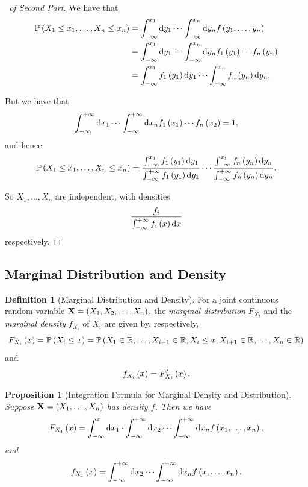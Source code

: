 \documentclass{article}
\newtheorem{proposition}[theorem]{Proposition}
\theoremstyle{definition}
\newtheorem{definition}[theorem]{Definition}
\theoremstyle{remark}
\newcommand{\RR}{\mathbb{R}}
\newcommand{\Prob}{\mathbb{P}}
\newcommand{\plusinfty}{+\infty}
\newcommand{\minusinfty}{-\infty}
\begin{document}
\begin{proof}[\proofname\ of Second Part]
    We have that
    \begin{align*}
        \Prob\pqty{X_1 \leq x_1, \ldots, X_n \leq x_n} &= \int_{\minusinfty}^{x_1} \dd{y_1} \cdots \int_{\minusinfty}^{x_n} \dd{y_n} f\pqty{y_1, \ldots, y_n} \\
        &= \int_{\minusinfty}^{x_1} \dd{y_1} \cdots \int_{\minusinfty}^{x_n} \dd{y_n} f_1\pqty{y_1} \cdots f_n\pqty{y_n} \\
        &= \int_{\minusinfty}^{x_1} f_1\pqty{y_1} \dd{y_1} \cdots \int_{\minusinfty}^{x_n} f_n\pqty{y_n} \dd{y_n}.
    \end{align*}

    But we have that
    \[
        \int_{\minusinfty}^{\plusinfty} \dd{x_1} \cdots \int_{\minusinfty}^{\plusinfty} \dd{x_n} f_1\pqty{x_1} \cdots f_n\pqty{x_2} = 1,
    \]
    and hence
    \[
        \Prob\pqty{X_1 \leq x_1, \ldots, X_n \leq x_n} = \frac{\int_{\minusinfty}^{x_1} f_1\pqty{y_1} \dd{y_1}}{\int_{\minusinfty}^{\plusinfty} f_1\pqty{y_1} \dd{y_1}} \cdots \frac{\int_{\minusinfty}^{x_1} f_n\pqty{y_n} \dd{y_n}}{\int_{\minusinfty}^{\plusinfty} f_n\pqty{y_n} \dd{y_n}}.
    \]

    So \(X_1, \ldots, X_n\) are independent, with densities
    \[
        \frac{f_i}{\int_{\minusinfty}^{\plusinfty} f_i\pqty{x} \dd{x}}
    \]
    respectively.
\end{proof}

\subsection{Marginal Distribution and Density}

\begin{definition}[Marginal Distribution and Density]
    \label{def:marginal-distribution-density}%
    For a joint continuous random variable \(\vb{X} = \pqty{X_1, X_2, \ldots, X_n}\), the \emph{marginal distribution} \(F_{X_i}\) and the \emph{marginal density} \(f_{X_i}\) of \(X_i\) are given by, respectively,
    \[
        F_{X_i} \pqty{x} = \Prob\pqty{X_i \leq x} = \Prob\pqty{X_1 \in \RR, \ldots, X_{i - 1} \in \RR, X_i \leq x, X_{i + 1} \in \RR, \ldots, X_n \in \RR}
    \]
    and
    \[
        f_{X_i} \left(x\right) = F_{X_i}'\left(x\right).
    \]
\end{definition}

\begin{proposition}[Integration Formula for Marginal Density and Distribution]
    \label{prop:marginal-distribution-density-formula}%
    Suppose \(\vb{X} = \pqty{X_1, \ldots, X_n}\) has density \(f\). Then we have
    \[
        F_{X_1} \pqty{x} = \int_{\minusinfty}^{x} \dd{x_1} \cdot \int_{\minusinfty}^{\plusinfty} \dd{x_2} \cdots \int_{\minusinfty}^{\plusinfty} \dd{x_n} f\pqty{x_1, \ldots, x_n},
    \]
    and
    \[
        f_{X_1} \pqty{x} = \int_{\minusinfty}^{\plusinfty} \dd{x_2} \cdots \int_{\minusinfty}^{\plusinfty} \dd{x_n} f\pqty{x, \ldots, x_n}.
    \]
\end{proposition}
\end{document}
